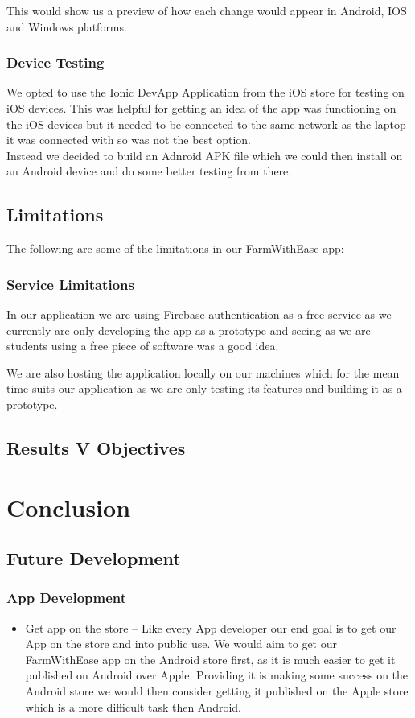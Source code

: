 \documentclass[12pt,a4paper,oneside,openany]{book}
\begin{document}
This would show us a preview of how each change would appear in Android, IOS and Windows platforms.

\subsection{Device Testing}
We opted to use the Ionic DevApp Application from the iOS store for testing on iOS devices. This was helpful for getting an idea of the app was functioning on the iOS devices but it needed to be connected to the same network as the laptop it was connected with so was not the best option.\\

\noindent
Instead we decided to build an Adnroid APK file which we could then install on an Android device and do some better testing from there.

\section{Limitations}
The following are some of the limitations in our FarmWithEase app:

\subsection{Service Limitations}
In our application we are using Firebase authentication as a free service as we currently are only developing the app as a prototype and seeing as we are students using a free piece of software was a good idea. 

We are also hosting the application locally on our machines which for the mean time suits our application as we are only testing its features and building it as a prototype.

\section{Results V Objectives}

\chapter{Conclusion}

\section{Future Development}

\subsection{App Development}
\begin{itemize}
    \item Get app on the store – Like every App developer our end goal is to get our App on the store and into public use. We would aim to get our FarmWithEase app on the Android store ﬁrst, as it is much easier to get it published on Android over Apple. Providing it is making some success on the Android store we would then consider getting it published on the Apple store which is a more difficult task then Android.
    
\end{itemize}
\end{document}
